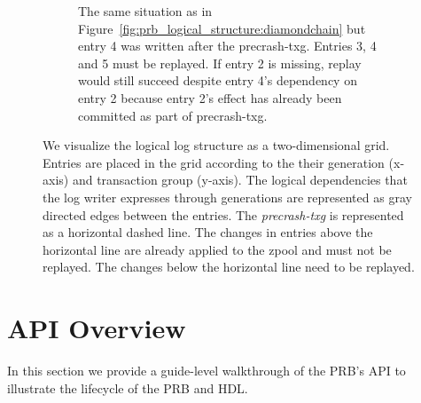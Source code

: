 \documentclass[12pt,a4paper,twoside]{book}
\begin{document}
\begin{figure}[H]
\begin{subfigure}{\textwidth}
        \caption{
            The same situation as in Figure~\ref{fig:prb_logical_structure:diamondchain} but entry 4 was written after the precrash-txg.
            Entries 3, 4 and 5 must be replayed.
            If entry 2 is missing, replay would still succeed despite entry 4's dependency on entry 2 because entry 2's effect has already been committed as part of precrash-txg.
            }
        \label{fig:prb_logical_structure:diamondchain2}
    \end{subfigure}
    \caption{
        We visualize the logical log structure as a two-dimensional grid.
        Entries are placed in the grid according to the their generation (x-axis) and transaction group (y-axis).
        The logical dependencies that the log writer expresses through generations are represented as gray directed edges between the entries.
        The \textit{precrash-txg} is represented as a horizontal dashed line.
        The changes in entries above the horizontal line are already applied to the zpool and must not be replayed.
        The changes below the horizontal line need to be replayed.
    }
    \label{fig:prb_logical_structure}
\end{figure}



\section{API Overview}\label{di:prb:api} %
In this section we provide a guide-level walkthrough of the PRB's API to illustrate the lifecycle of the PRB and HDL.
\end{document}
